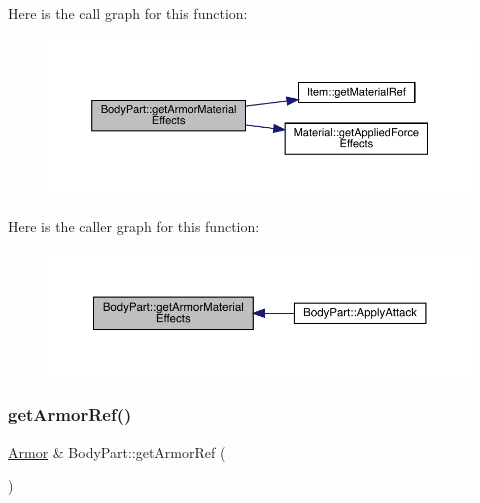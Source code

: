 Here is the call graph for this function\+:
\nopagebreak
\begin{figure}[H]
\begin{center}
\leavevmode
\includegraphics[width=350pt]{d2/d6f/class_body_part_a7c4d742811e49a2c97b9bec6c1785e94_cgraph}
\end{center}
\end{figure}
Here is the caller graph for this function\+:
\nopagebreak
\begin{figure}[H]
\begin{center}
\leavevmode
\includegraphics[width=350pt]{d2/d6f/class_body_part_a7c4d742811e49a2c97b9bec6c1785e94_icgraph}
\end{center}
\end{figure}
\mbox{\label{class_body_part_a0398943f64891c99b3a05f20baeccd55}} 
\subsubsection{\texorpdfstring{get\+Armor\+Ref()}{getArmorRef()}}
{\footnotesize\ttfamily \mbox{\hyperlink{class_armor}{Armor}} \& Body\+Part\+::get\+Armor\+Ref (\begin{DoxyParamCaption}{ }\end{DoxyParamCaption})}

\mbox{\label{class_body_part_af5a68e571235e6b4e8cd6a13ec94bab3}} 
